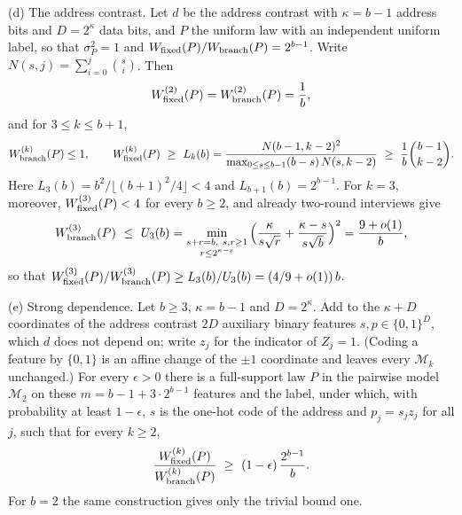 \begin{theorem}
\textup{(d) The address contrast.} Let $d$ be the address contrast with
$\kappa=b-1$ address bits and $D=2^\kappa$ data bits, and $P$ the uniform law
with an independent uniform label, so that $\sigma_P^2=1$ and
$W_{\rm fixed}(P)/W_{\rm branch}(P)=2^{b-1}$. Write
$N(s,j)=\sum_{i=0}^{j}\binom si$. Then
\[
 W^{(2)}_{\rm fixed}(P)=W^{(2)}_{\rm branch}(P)=\frac1b,
\]
and for $3\le k\le b+1$,
\[
 W^{(k)}_{\rm branch}(P)\le1,\qquad
 W^{(k)}_{\rm fixed}(P)\ \ge\ L_k(b)=\frac{N(b-1,k-2)^2}{\max_{0\le s\le b-1}(b-s)\,N(s,k-2)}\ \ge\ \frac1b\binom{b-1}{k-2}.
\]
Here $L_3(b)=b^2/\lfloor(b+1)^2/4\rfloor<4$ and $L_{b+1}(b)=2^{b-1}$. For
$k=3$, moreover, $W^{(3)}_{\rm fixed}(P)<4$ for every $b\ge2$, and already
two-round interviews give
\[
 W^{(3)}_{\rm branch}(P)\ \le\ U_3(b)=\min_{\substack{s+r=b,\ s,r\ge1\\ r\le2^{\kappa-s}}}
   \Big(\frac{\kappa}{s\sqrt r}+\frac{\kappa-s}{s\sqrt b}\Big)^2=\frac{9+o(1)}{b},
\]
so that $W^{(3)}_{\rm fixed}(P)/W^{(3)}_{\rm branch}(P)\ge L_3(b)/U_3(b)=(4/9+o(1))\,b$.

\textup{(e) Strong dependence.} Let $b\ge3$, $\kappa=b-1$ and $D=2^\kappa$.
Add to the $\kappa+D$ coordinates of the address contrast $2D$ auxiliary
binary features $s,p\in\{0,1\}^D$, which $d$ does not depend on; write $z_j$
for the indicator of $Z_j=1$. (Coding a feature by $\{0,1\}$ is an affine
change of the $\pm1$ coordinate and leaves every $\mathcal M_k$ unchanged.)
For every $\epsilon>0$ there is a full-support law $P$ in the pairwise model
$\mathcal M_2$ on these $m=b-1+3\cdot2^{b-1}$ features and the label, under
which, with probability at least $1-\epsilon$, $s$ is the one-hot code of the
address and $p_j=s_jz_j$ for all $j$, such that for every $k\ge2$,
\[
 \frac{W^{(k)}_{\rm fixed}(P)}{W^{(k)}_{\rm branch}(P)}\ \ge\ (1-\epsilon)\,\frac{2^{b-1}}{b}.
\]
For $b=2$ the same construction gives only the trivial bound one.
\end{theorem}


